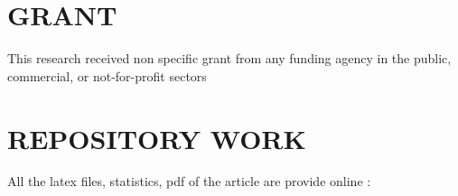 \documentclass{aes2e}
\begin{document}
\section{GRANT}
This research received non specific grant from any funding agency in the public, commercial, or not-for-profit sectors

\section{REPOSITORY WORK}
All the latex files, statistics, pdf of the article are provide online : 




%
%
%
%
%
%
%  

%
%
%
%
\end{document}
